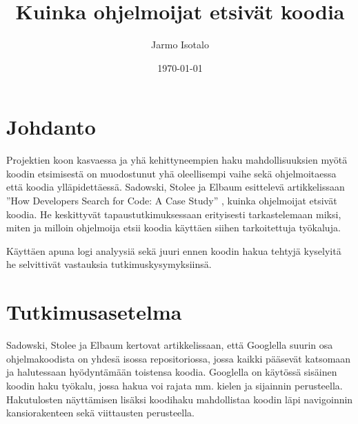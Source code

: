 \documentclass[finnish]{../tktltiki2}
\title{Kuinka ohjelmoijat etsivät koodia}
\author{Jarmo Isotalo}
\date{\today}
\theoremstyle{definition}
\theoremstyle{remark}
\begin{document}

\frontmatter      %

\maketitle        %

\tableofcontents  %


\mainmatter       %

\section{Johdanto}

Projektien koon kasvaessa ja yhä kehittyneempien haku mahdollisuuksien myötä koodin etsimisestä on muodostunut yhä oleellisempi vaihe sekä ohjelmoitaessa että koodia ylläpidettäessä. Sadowski, Stolee ja Elbaum esittelevä artikkelissaan ''How Developers Search for Code: A Case Study'' \cite{g_search_code}, kuinka ohjelmoijat etsivät koodia.
He keskittyvät tapaustutkimuksessaan erityisesti tarkastelemaan miksi, miten ja milloin ohjelmoija etsii koodia käyttäen siihen tarkoitettuja työkaluja.

Käyttäen apuna logi analyysiä sekä juuri ennen koodin hakua tehtyjä kyselyitä he selvittivät vastauksia tutkimuskysymyksiinsä.




\section{Tutkimusasetelma}

Sadowski, Stolee ja Elbaum kertovat artikkelissaan, että Googlella suurin osa ohjelmakoodista on yhdesä isossa repositoriossa, jossa kaikki pääsevät katsomaan ja halutessaan hyödyntämään toistensa koodia. Googlella on käytössä sisäinen koodin haku työkalu, jossa hakua voi rajata mm. kielen ja sijainnin perusteella. Hakutulosten näyttämisen lisäksi koodihaku mahdollistaa koodin läpi navigoinnin kansiorakenteen sekä viittausten perusteella. %
\end{document}
